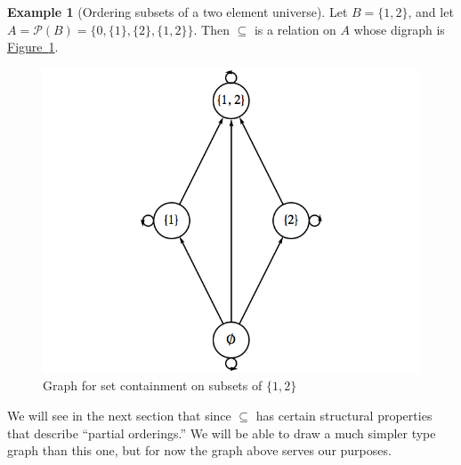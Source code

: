 \documentclass[10pt,]{book}
\theoremstyle{plain}
\theoremstyle{definition}
\theoremstyle{definition}
\theoremstyle{definition}
\newtheorem{example}[theorem]{Example}
\theoremstyle{definition}
\begin{document}
\begin{example}[Ordering subsets of a two element universe]\label{ex-subsets-2-ordering}
 Let \(B = \{1,2\}\), and let \(A = \mathcal{P}(B) = \{0, \{1\}, \{2\}, \{1,2\}\}\). Then \(\subseteq\) is a relation on \(A\) whose digraph is \hyperref[fig-graph-6-2-subsets-2]{Figure~\ref{fig-graph-6-2-subsets-2}}.%
\leavevmode%
\begin{figure}
\centering
\includegraphics[width=1\linewidth]{images/graph-6-2-subsets-2.png}
\caption{Graph for set containment on subsets of \(\{1,2\}\) \label{fig-graph-6-2-subsets-2}}
\end{figure}
\par
We will see in the next section that since \(\subseteq\) has certain structural properties that describe ``partial orderings.'' We will be able to draw a much simpler type graph than this one, but for now the graph above serves our purposes.%
\end{example}
\typeout{************************************************}
\typeout{************************************************}
\end{document}
